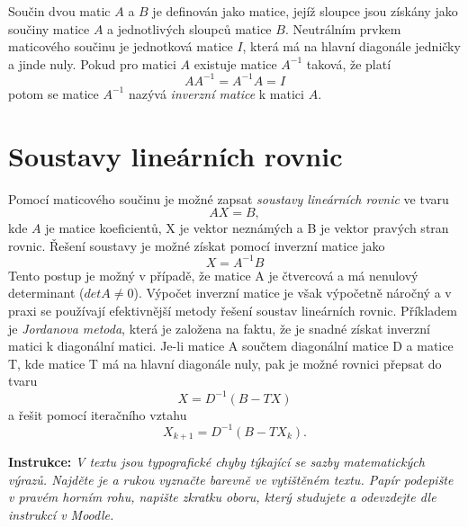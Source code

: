 \documentclass[11pt]{amsart}
\begin{document}
Součin dvou matic $A$ a $B$ je definován jako matice, jejíž sloupce jsou získány
jako součiny matice $A$ a jednotlivých sloupců matice $B$. Neutrálním prvkem
maticového součinu je jednotková matice $I$, která má na hlavní diagonále
jedničky a jinde nuly. Pokud pro matici $A$ existuje matice $A^{-1}$ taková, že platí
\[A A^{-1} = A^{-1} A = I\]
potom se matice $A^{-1}$ nazývá \textit{inverzní matice} k matici $A$.

\section*{Soustavy lineárních rovnic}

Pomocí maticového součinu je možné zapsat \textit{soustavy lineárních rovnic}
ve tvaru
\[A X = B,\]
{}\indent kde $A$ je matice koeficientů, X je vektor neznámých a B je vektor pravých stran rovnic.
Řešení soustavy je možné získat pomocí inverzní matice jako
\[X = A^{-1} B\]
Tento postup je možný v případě, že matice A je čtvercová a má nenulový
determinant ($det A\neq 0$). Výpočet inverzní matice je však výpočetně náročný a v praxi se používají
efektivnější metody řešení soustav lineárních rovnic. Příkladem je \textit{Jordanova
metoda}, která je založena na faktu, že je snadné získat inverzní matici k
diagonální matici. Je-li matice A součtem diagonální matice D a matice T, 
kde matice T má na hlavní diagonále nuly, pak je možné rovnici přepsat do tvaru 
\[X = D^{-1}(B-TX)\]
a řešit pomocí iteračního vztahu 
\[X_{k+1} = D^{-1}(B-TX_k).\]





\vfill
{\bfseries Instrukce:} \itshape V textu jsou typografické chyby týkající se sazby matematických výrazů. 
Najděte je a rukou vyznačte barevně ve vytištěném textu. Papír podepište v pravém horním rohu, napište zkratku 
oboru, který studujete
a odevzdejte dle instrukcí v Moodle. 
\end{document}
